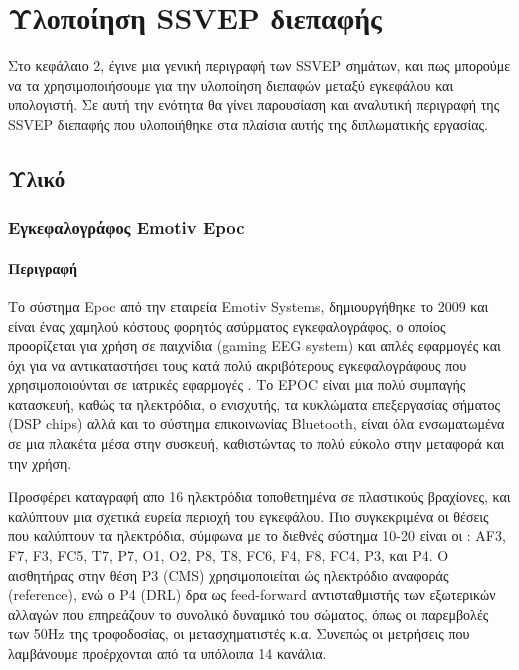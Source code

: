 \documentclass[11pt,a4paper,english,greek,twoside]{../Thesis}
\begin{document}
\chapter{Υλοποίηση SSVEP διεπαφής} \label{chap:SSVEP_implementation}
Στο κεφάλαιο 2, έγινε μια γενική περιγραφή των SSVEP σημάτων, και πως μπορούμε να τα χρησιμοποιήσουμε για την υλοποίηση διεπαφών μεταξύ εγκεφάλου και υπολογιστή. Σε αυτή την ενότητα θα γίνει παρουσίαση και αναλυτική περιγραφή της SSVEP διεπαφής που υλοποιήθηκε στα πλαίσια αυτής της διπλωματικής εργασίας.

\section{Υλικό}
\subsection{Εγκεφαλογράφος Emotiv Epoc}
\subsubsection{Περιγραφή}
\par Το σύστημα  Epoc από την εταιρεία Emotiv Systems, δημιουργήθηκε το 2009 και είναι ένας χαμηλού κόστους φορητός ασύρματος εγκεφαλογράφος, ο οποίος προορίζεται για χρήση σε παιχνίδια (gaming EEG system) και απλές εφαρμογές και όχι για να αντικαταστήσει τους κατά πολύ ακριβότερους εγκεφαλογράφους που χρησιμοποιούνται σε ιατρικές εφαρμογές . Το EPOC είναι μια πολύ συμπαγής κατασκευή, καθώς τα ηλεκτρόδια, ο ενισχυτής, τα κυκλώματα επεξεργασίας σήματος (DSP chips) αλλά και το σύστημα επικοινωνίας Bluetooth, είναι όλα ενσωματωμένα σε μια πλακέτα μέσα στην συσκευή, καθιστώντας το πολύ εύκολο στην μεταφορά και την χρήση. 
\par Προσφέρει καταγραφή απο 16 ηλεκτρόδια τοποθετημένα σε πλαστικούς βραχίονες, και  καλύπτουν μια σχετικά ευρεία περιοχή του εγκεφάλου. Πιο συγκεκριμένα οι θέσεις που καλύπτουν τα ηλεκτρόδια, σύμφωνα με το διεθνές σύστημα 10-20 είναι οι : AF3, F7, F3, FC5, T7, P7, O1, O2, P8, T8, FC6, F4, F8, FC4, P3, και P4. Ο αισθητήρας στην θέση P3 (CMS) χρησιμοποιείται ώς ηλεκτρόδιο αναφοράς (reference), ενώ ο P4 (DRL) δρα ως feed-forward αντισταθμιστής των εξωτερικών αλλαγών που επηρεάζουν το συνολικό δυναμικό του σώματος, όπως οι παρεμβολές των 50Hz της τροφοδοσίας, οι μετασχηματιστές κ.α. Συνεπώς οι μετρήσεις που λαμβάνουμε προέρχονται από τα υπόλοιπα 14 κανάλια.
\end{document}
